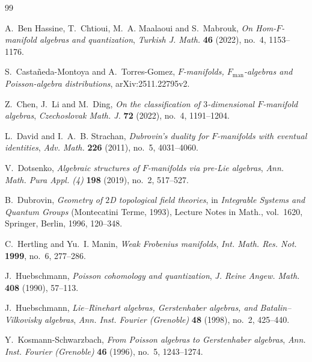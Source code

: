 \documentclass[12pt,reqno]{amsart}
\theoremstyle{definition}
\theoremstyle{remark}
\begin{document}
	\begin{thebibliography}{99}
		
		A.~Ben Hassine, T.~Chtioui, M.~A. Maalaoui and S.~Mabrouk,
		\emph{On Hom-$F$-manifold algebras and quantization},
		\emph{Turkish J. Math.} \textbf{46} (2022), no.~4, 1153--1176.
		
		
		S.~Casta\~neda-Montoya and A.~Torres-Gomez,
		\emph{$F$-manifolds, $F_{\mathrm{man}}$-algebras and Poisson-algebra
			distributions},
		arXiv:2511.22795v2.
		
		Z.~Chen, J.~Li and M.~Ding,
		\emph{On the classification of $3$-dimensional $F$-manifold algebras},
		\emph{Czechoslovak Math. J.} \textbf{72} (2022), no.~4, 1191--1204.
		
		L.~David and I.~A.~B. Strachan,
		\emph{Dubrovin's duality for $F$-manifolds with eventual identities},
		\emph{Adv. Math.} \textbf{226} (2011), no.~5, 4031--4060.
		
		V.~Dotsenko,
		\emph{Algebraic structures of $F$-manifolds via pre-Lie algebras},
		\emph{Ann. Math. Pura Appl. (4)} \textbf{198} (2019), no.~2, 517--527.
		
		B.~Dubrovin,
		\emph{Geometry of $2$D topological field theories},
		in \emph{Integrable Systems and Quantum Groups} (Montecatini Terme, 1993),
		Lecture Notes in Math., vol.~1620, Springer, Berlin, 1996, 120--348.
		
		C.~Hertling and Yu.~I. Manin,
		\emph{Weak Frobenius manifolds},
		\emph{Int. Math. Res. Not.} \textbf{1999}, no.~6, 277--286.
		
		J.~Huebschmann,
		\emph{Poisson cohomology and quantization},
		\emph{J. Reine Angew. Math.} \textbf{408} (1990), 57--113.
		
		J.~Huebschmann,
		\emph{Lie--Rinehart algebras, Gerstenhaber algebras, and
			Batalin--Vilkovisky algebras},
		\emph{Ann. Inst. Fourier (Grenoble)} \textbf{48} (1998), no.~2, 425--440.
		
		Y.~Kosmann-Schwarzbach,
		\emph{From Poisson algebras to Gerstenhaber algebras},
		\emph{Ann. Inst. Fourier (Grenoble)} \textbf{46} (1996), no.~5,
		1243--1274.
		

\end{thebibliography}
\end{document}
